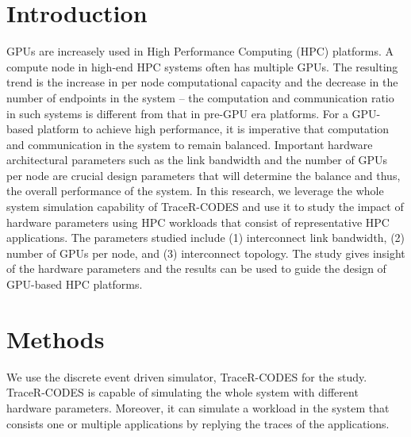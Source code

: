 \documentclass[conference]{IEEEtran}
\begin{document}
\section{Introduction}

GPUs are increasely used in High Performance Computing (HPC) platforms. A compute node
in high-end HPC systems often has multiple GPUs. The resulting trend
is the increase in per node computational capacity and the decrease in the number
of endpoints in the system -- the computation and communication ratio in such systems
is different from that in pre-GPU era platforms. For a GPU-based platform to achieve
high performance, it is imperative that computation and communication in the system
to remain balanced. Important hardware architectural parameters such as the
link bandwidth and the number of GPUs per node are crucial design parameters that will
determine the balance and thus, the overall performance of the system. In this research,
we leverage the whole system simulation capability of TraceR-CODES \cite{b4} and use it
to study the impact of hardware parameters using HPC workloads that consist of
representative HPC applications. The parameters studied include
(1) interconnect link bandwidth, (2) number of GPUs per node, and (3) interconnect topology.
The study gives insight of the hardware parameters and the results can be used to guide
the design of GPU-based HPC platforms. 


\section{Methods}

We use the discrete event driven simulator, TraceR-CODES\cite{b4} for the study.
TraceR-CODES is capable of simulating the whole system with different hardware parameters.
Moreover, it can simulate a workload in the system that consists one
or multiple applications by replying the traces of the applications. 
\end{document}
